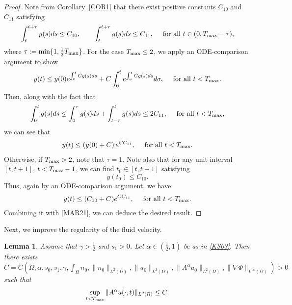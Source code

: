 \documentclass{amsart}
\newtheorem{lemma}[defn]{Lemma}
\numberwithin{equation}{section}
\begin{document}
\begin{proof}
Note from Corollary~\ref{COR1} that there exist positive constants $C_{10}$ and $C_{11}$ satisfying
\[
\int_{t}^{t+\tau}y(s)ds\le C_{10},\qquad \int_{t}^{t+\tau}g(s)ds\le C_{11},\quad\mbox{ for all }t\in(0,T_{\rm max}-\tau),
\]
 where $\tau:=\min\{1,\frac{1}{2}T_{\rm max}\}$. For the case $T_{\rm max}\le2$, we 
apply an ODE-comparison argument to show  
\[
y(t)\le y(0)e^{\int_{0}^{t}Cg(s)ds}+C\int_{0}^{t}e^{\int_{\sigma}^{t}Cg(s)ds}d\sigma, \quad\mbox{ for all }t< T_{\rm max}.
\] 
Then, along with the fact that
\[
\int_{0}^{t}g(s)ds\le \int_{0}^{\tau}g(s)ds+\int_{t-\tau}^{t}g(s)ds\le 2C_{11}, \quad\mbox{ for all }t< T_{\rm max},
\]
we can see that
\begin{equation}\label{MAR21}
y(t)\le \left( y(0)+C \right)e^{CC_{11}}, \quad\mbox{ for all }t<T_{\rm max}.
\end{equation}
Otherwise, if $T_{\rm max}>2$, note that $\tau=1$.
Note also that for any unit interval $[t,t+1]$, $t<T_{\rm max}-1$, we can find $t_{0}\in[t,t+1]$ satisfying
\[
y(t_0)\le C_{10}.
\]
Thus, again by an ODE-comparison argument, we have 
\[
y(t)\le (C_{10}+C)e^{CC_{11}},\quad\mbox{ for all }t<T_{\rm max}.
\]
Combining it with \eqref{MAR21}, we can deduce the desired result.
\end{proof}


Next, we improve the regularity of the fluid velocity.

\begin{lemma}\label{LEM13}
Assume that $\gamma>\frac12$ and $s_1>0$. Let $\alpha\in(\frac12,1)$ be as in \eqref{KS03}. Then there exists $C=C (\Omega,\alpha,s_0,s_1,\gamma,\int_\Omega n_0,\|n_0\|_{L^2(\Omega)}, \|u_0\|_{L^2(\Omega)},
\|A^\alpha u_0\|_{L^2(\Omega)},\|\nabla\Phi\|_{L^\infty(\Omega)} )>0$ such that
\[
\sup_{t<T_{\rm max}}   \| A^{\alpha} u(\cdot,t)\|_{L^{2}(\Omega)}  \le C.
\]
\end{lemma}
\end{document}
